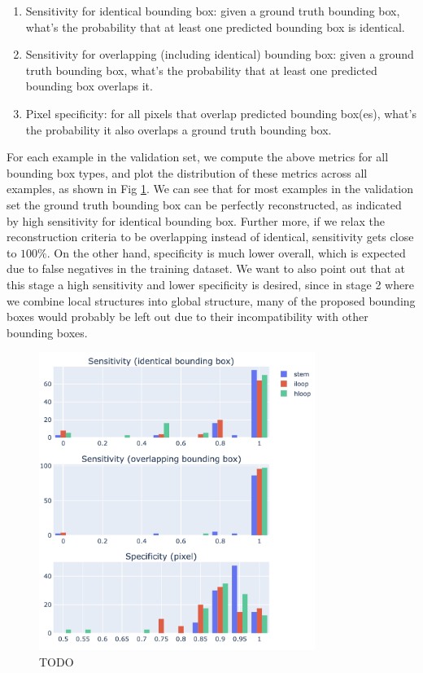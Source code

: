 \documentclass[12pt]{article}
\begin{document}
\begin{enumerate}
    \item Sensitivity for identical bounding box:
    given a ground truth bounding box, what's the probability that at least one predicted bounding box is identical.
    \item Sensitivity for overlapping (including identical) bounding box:
    given a ground truth bounding box, what's the probability that at least one predicted bounding box overlaps it.

    \item Pixel specificity:
    for all pixels that overlap predicted bounding box(es), what's the probability it also overlaps a ground truth bounding box.
\end{enumerate}


For each example in the validation set, we compute the above metrics for all bounding box types,
and plot the distribution of these metrics across all examples, as shown in Fig \ref{fig:performance_metrics}.
We can see that for most examples in the validation set the ground truth bounding box can be perfectly reconstructed,
as indicated by high sensitivity for identical bounding box.
Further more, if we relax the reconstruction criteria to be overlapping instead of identical,
sensitivity gets close to $100\%$.
On the other hand, specificity is much lower overall,
which is expected due to false negatives in the training dataset.
We want to also point out that at this stage a high sensitivity and lower specificity is desired,
since in stage 2 where we combine local structures into global structure, many of the proposed bounding boxes
would probably be left out due to their incompatibility with other bounding boxes.


\begin{figure}[h]
    \centering
    \includegraphics[width=0.8\textwidth]{plot/performance_metrics.png}
    \caption{TODO}
    \label{fig:performance_metrics}
    \centering
\end{figure}
\end{document}
